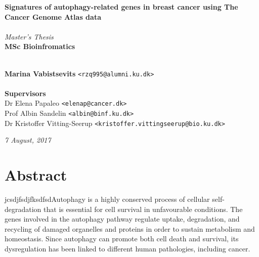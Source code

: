 \documentclass[10pt, openright,oneside]{book}
\begin{document}
\frontmatter
    \thispagestyle{empty}
    
    \vspace*{4.5cm} 
    \noindent \textbf{\huge Signatures of autophagy-related genes in breast cancer using The Cancer Genome Atlas data} \\
    \\[0.5cm]
    \textit{\Large Master's Thesis} \\
    [0.5cm]
    \textbf{\Large MSc Bioinfromatics} \\
    \vspace*{.1cm} \\
    \begin{tabbing}
    \textbf{Marina Vabistsevits} \hspace{1cm} \= \texttt{<rzq995@alumni.ku.dk>} \\
    \\[9cm]
    \textbf{\Large Supervisors} \\
    Dr Elena Papaleo \> \texttt{<elenap@cancer.dk>} \\
    Prof Albin Sandelin \> \texttt{<albin@binf.ku.dk>} \\
    Dr Kristoffer Vitting-Seerup\> \texttt{<kristoffer.vittingseerup@bio.ku.dk>}
    \\[1cm]
    
    \end{tabbing}
    \begin{center}
    \textit{7 August, 2017} 
    \end{center}

    \newpage
    \ClearWallPaper
    


\pagestyle{plain}

\tableofcontents

\mainmatter

\chapter*{Abstract}
jcsdjfsdjfksdfsdAutophagy is a highly conserved process of cellular self-degradation that is essential for cell
survival in unfavourable conditions. The genes involved in the autophagy pathway regulate
uptake, degradation, and recycling of damaged organelles and proteins in order to sustain
metabolism and homeostasis. Since autophagy can promote both cell death and survival, its
dysregulation has been linked to different human pathologies, including cancer.
\end{document}
